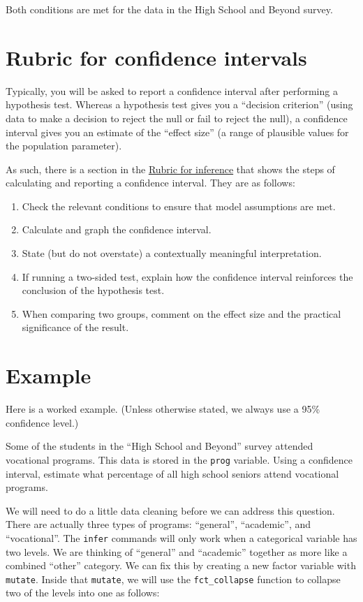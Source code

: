 \documentclass[
]{book}
\providecommand{\tightlist}{%
  \setlength{\itemsep}{0pt}\setlength{\parskip}{0pt}}
\begin{document}
Both conditions are met for the data in the High School and Beyond survey.

\hypertarget{ci-rubric}{%
\section{Rubric for confidence intervals}\label{ci-rubric}}

Typically, you will be asked to report a confidence interval after performing a hypothesis test. Whereas a hypothesis test gives you a ``decision criterion'' (using data to make a decision to reject the null or fail to reject the null), a confidence interval gives you an estimate of the ``effect size'' (a range of plausible values for the population parameter).

As such, there is a section in the \protect\hyperlink{appendix-rubric}{Rubric for inference} that shows the steps of calculating and reporting a confidence interval. They are as follows:

\begin{enumerate}
\def\labelenumi{\arabic{enumi}.}
\tightlist
\item
  Check the relevant conditions to ensure that model assumptions are met.
\item
  Calculate and graph the confidence interval.
\item
  State (but do not overstate) a contextually meaningful interpretation.
\item
  If running a two-sided test, explain how the confidence interval reinforces the conclusion of the hypothesis test.
\item
  When comparing two groups, comment on the effect size and the practical significance of the result.
\end{enumerate}

\hypertarget{ci-ex}{%
\section{Example}\label{ci-ex}}

Here is a worked example. (Unless otherwise stated, we always use a 95\% confidence level.)

Some of the students in the ``High School and Beyond'' survey attended vocational programs. This data is stored in the \texttt{prog} variable. Using a confidence interval, estimate what percentage of all high school seniors attend vocational programs.

We will need to do a little data cleaning before we can address this question. There are actually three types of programs: ``general'', ``academic'', and ``vocational''. The \texttt{infer} commands will only work when a categorical variable has two levels. We are thinking of ``general'' and ``academic'' together as more like a combined ``other'' category. We can fix this by creating a new factor variable with \texttt{mutate}. Inside that \texttt{mutate}, we will use the \texttt{fct\_collapse} function to collapse two of the levels into one as follows:
\end{document}
